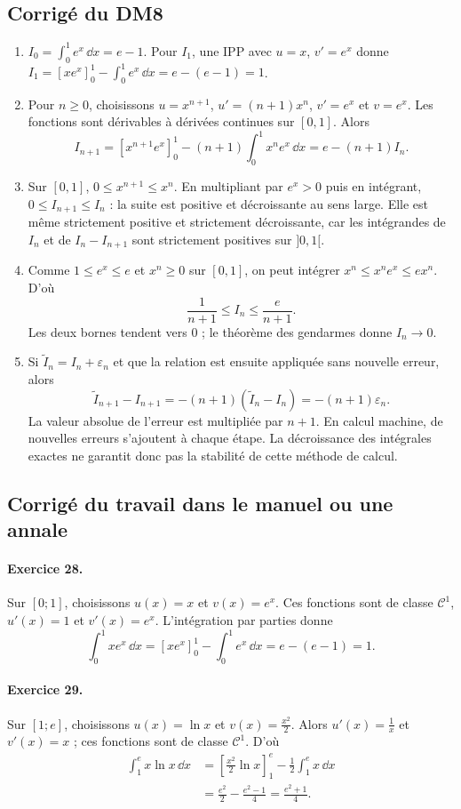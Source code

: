 \subsection{Corrigé du DM8}\begin{enumerate}
\item $I_0=\int_0^1e^x\,\dd x=e-1$. Pour $I_1$, une IPP avec $u=x$, $v'=e^x$ donne $I_1=[xe^x]_0^1-\int_0^1e^x\,\dd x=e-(e-1)=1$.
\item Pour $n\ge0$, choisissons $u=x^{n+1}$, $u'=(n+1)x^n$, $v'=e^x$ et $v=e^x$. Les fonctions sont dérivables à dérivées continues sur $[0,1]$. Alors
\[I_{n+1}=[x^{n+1}e^x]_0^1-(n+1)\int_0^1x^ne^x\,\dd x=e-(n+1)I_n.\]
\item Sur $[0,1]$, $0\le x^{n+1}\le x^n$. En multipliant par $e^x>0$ puis en intégrant, $0\le I_{n+1}\le I_n$ : la suite est positive et décroissante au sens large. Elle est même strictement positive et strictement décroissante, car les intégrandes de $I_n$ et de $I_n-I_{n+1}$ sont strictement positives sur $]0,1[$.
\item Comme $1\le e^x\le e$ et $x^n\ge0$ sur $[0,1]$, on peut intégrer $x^n\le x^ne^x\le ex^n$. D'où
\[\frac1{n+1}\le I_n\le\frac e{n+1}.\]
Les deux bornes tendent vers $0$ ; le théorème des gendarmes donne $I_n\to0$.
\item Si $\widetilde I_n=I_n+\varepsilon_n$ et que la relation est ensuite appliquée sans nouvelle erreur, alors
\[\widetilde I_{n+1}-I_{n+1}=-(n+1)(\widetilde I_n-I_n)=-(n+1)\varepsilon_n.\]
La valeur absolue de l'erreur est multipliée par $n+1$. En calcul machine, de nouvelles erreurs s'ajoutent à chaque étape. La décroissance des intégrales exactes ne garantit donc pas la stabilité de cette méthode de calcul.
\end{enumerate}

\subsection{Corrigé du travail dans le manuel ou une annale}\paragraph{Exercice 28.} Sur $[0;1]$, choisissons $u(x)=x$ et $v(x)=e^x$. Ces fonctions sont de classe $\mathcal C^1$, $u'(x)=1$ et $v'(x)=e^x$. L'intégration par parties donne
\[\int_0^1xe^x\,\dd x=[xe^x]_0^1-\int_0^1e^x\,\dd x=e-(e-1)=1.\]
\paragraph{Exercice 29.} Sur $[1;e]$, choisissons $u(x)=\ln x$ et $v(x)=\frac{x^2}2$. Alors $u'(x)=\frac1x$ et $v'(x)=x$ ; ces fonctions sont de classe $\mathcal C^1$. D'où
\[\begin{aligned}\int_1^e x\ln x\,\dd x&=\left[\frac{x^2}2\ln x\right]_1^e-\frac12\int_1^e x\,\dd x\\&=\frac{e^2}2-\frac{e^2-1}4=\frac{e^2+1}4.\end{aligned}\]

\fi

